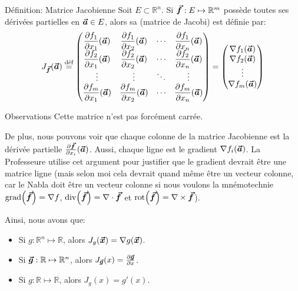 \documentclass[a4paper]{article}
\begin{document}
\begin{parag}{Définition: Matrice Jacobienne}
    Soit $E \subset \mathbb{R}^n$. Si $\bm{\protect\vec{f}}: E \mapsto \mathbb{R}^m$ possède toutes ses dérivées partielles en $\bm{\protect\vec{a}}\in E$, alors sa  (matrice de Jacobi) est définie par:
    \[J_{\bvec{f}}\left(\bvec{a}\right) \over{=}{déf} \begin{pmatrix} \dfrac{\partial f_1}{\partial x_1}\left(\bvec{a}\right) & \dfrac{\partial f_1}{\partial x_2}\left(\bvec{a}\right) & \cdots & \dfrac{\partial f_1}{\partial x_n}\left(\bvec{a}\right) \\ \dfrac{\partial f_2}{\partial x_1}\left(\bvec{a}\right) & \dfrac{\partial f_2}{\partial x_2}\left(\bvec{a}\right) & \cdots & \dfrac{\partial f_2}{\partial x_n}\left(\bvec{a}\right) \\ \vdots & \vdots & \ddots & \vdots \\ \dfrac{\partial f_m}{\partial x_1}\left(\bvec{a}\right) & \dfrac{\partial f_m}{\partial x_2}\left(\bvec{a}\right) & \cdots & \dfrac{\partial f_m}{\partial x_n}\left(\bvec{a}\right) \end{pmatrix} = \begin{pmatrix} \nabla f_1\left(\bvec{a}\right) \\ \nabla f_2\left(\bvec{a}\right) \\ \vdots \\ \nabla f_m\left(\bvec{a}\right) \end{pmatrix}\]

    \begin{subparag}{Observations}
        Cette matrice n'est pas forcément carrée.

        De plus, nous pouvons voir que chaque colonne de la matrice Jacobienne est la dérivée partielle $\frac{\partial \bvec{f}}{\partial x_i}\left(\bvec{a}\right)$. Aussi, chaque ligne est le gradient $\nabla f_i\left(\bvec{a}\right)$. La Professeure utilise cet argument pour justifier que le gradient devrait être une matrice ligne (mais selon moi cela devrait quand même être un vecteur colonne, car le Nabla doit être un vecteur colonne si nous voulons la mnémotechnie $\grad\left(\bvec{f}\right) = \nabla f$, $\Div\left(\bvec{f}\right) = \nabla \cdot \bvec{f}$ et $\rot\left(\bvec{f}\right) = \nabla \times \bvec{f}$).

        Ainsi, nous avons que:
        \begin{itemize}
            \item Si $g : \mathbb{R}^n \mapsto \mathbb{R}$, alors $J_g\left(\bvec{x}\right) = \nabla g\left(\bvec{x}\right)$.
            \item Si $\bm{\protect\vec{g}}: \mathbb{R} \mapsto \mathbb{R}^n$, alors $J_{\bvec{g}}\left(x\right) = \frac{\partial \bvec{g}}{\partial x}$.
            \item Si $g: \mathbb{R}\mapsto\mathbb{R}$, alors $J_g\left(x\right) = g'\left(x\right)$.
        \end{itemize}
    \end{subparag}
    


\end{parag}
\end{document}

